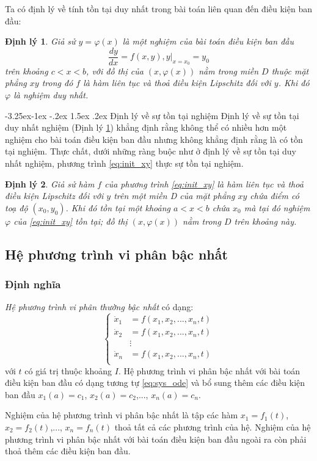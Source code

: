 \documentclass[a4paper]{article}
\makeatletter
\newtheorem{theorem}{{\bf Định lý}}
\newcounter {subsubsubsection}[subsubsection]
\newcommand\subsubsubsection{\@startsection{subsubsubsection}{4}{\z@}%
                                     {-3.25ex\@plus -1ex \@minus -.2ex}%
                                     {1.5ex \@plus .2ex}%
                                     {\normalfont\normalsize\bfseries}}
\makeatother
\begin{document}
Ta có định lý về tính tồn tại duy nhất trong bài toán liên quan đến điều kiện ban đầu:
\begin{theorem}\label{theorem:unique}
Giả sử $y = \varphi(x)$ là một nghiệm của bài toán điều kiện ban đầu
    \begin{equation}\label{eq:init_xy}
        \dfrac{dy}{dx} = f(x,y), y|_{x=x_0} = y_0
    \end{equation}
trên khoảng $c < x < b$, với đồ thị của $(x, \varphi(x))$ nằm trong miền $D$ thuộc mặt phẳng $xy$ trong đó $f$ là hàm liên tục và thoả điều kiện Lipschitz đối với $y$. Khi đó $\varphi$ là nghiệm duy nhất.
\end{theorem}
\subsubsubsection{Định lý về sự tồn tại nghiệm}
Định lý về sự tồn tại duy nhất nghiệm (Định lý \ref{theorem:unique}) khẳng định rằng không thể có nhiều hơn một nghiệm cho bài toán điều kiện ban đầu nhưng không khẳng định rằng là có tồn tại nghiệm. Thực chất, dưới những ràng buộc như ở định lý về sự tồn tại duy nhất nghiệm, phương trình \eqref{eq:init_xy} thực sự tồn tại nghiệm. \par
\begin{theorem}\label{theorem:exist}
Giả sử hàm $f$ của phương trình \eqref{eq:init_xy} là hàm liên tục và thoả điều kiện Lipschitz đối với $y$ trên một miền D của mặt phẳng $xy$ chứa điểm có toạ độ $(x_0, y_0)$. Khi đó tồn tại một khoảng $a < x < b$ chứa $x_0$ mà tại đó nghiệm $\varphi$ của \eqref{eq:init_xy} tồn tại; đồ thị $(x, \varphi(x))$ nằm trong $D$ trên khoảng này.
\end{theorem}
\subsection{Hệ phương trình vi phân bậc nhất}
\subsubsection{Định nghĩa}
\textit{Hệ phương trình vi phân thường bậc nhất} có dạng:
\begin{equation}\label{eq:sys_ode}
    \begin{cases}
        \dot{x}_1 & = f(x_1, x_2,...,x_n, t) \\
        \dot{x}_2 & = f(x_1, x_2,...,x_n, t) \\
                  & \vdots \\
        \dot{x}_n & = f(x_1, x_2,...,x_n, t) \\
    \end{cases}
\end{equation}
với $t$ có giá trị thuộc khoảng $I$. Hệ phương trình vi phân bậc nhất với bài toán điều kiện ban đầu có dạng tương tự \eqref{eq:sys_ode} và bổ sung thêm các điều kiện ban đầu $x_1(a) = c_1$, $x_2(a) = c_2$,..., $x_n(a) = c_n$. \par
Nghiệm của hệ phương trình vi phân bậc nhất là tập các hàm $x_1 = f_1(t)$, $x_2 = f_2(t)$,..., $x_n = f_n(t)$ thoả tất cả các phương trình của hệ. Nghiệm của hệ phương trình vi phân bậc nhất với bài toán điều kiện ban đầu ngoài ra còn phải thoả thêm các điều kiện ban đầu. 
\end{document}
